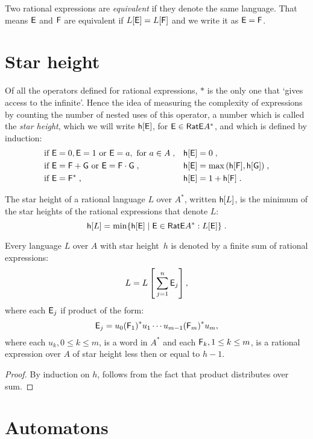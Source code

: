 Two rational expressions are \emph{equivalent} if they denote the same language. That means ${\mathsf{E}}$ and ${\mathsf{F}}$ are equivalent if $L[{\mathsf{E}}] = L[{\mathsf{F}}]$ and we write it as ${\mathsf{E}} = {\mathsf{F}}$.

\section{Star height}

Of all the operators defined for rational expressions, $*$ is the only one that `gives access to the infinite'. Hence the idea of measuring the complexity of expressions by counting the number of nested uses of this operator, a number which is called the \emph{star height}, which we will write ${\mathsf{h}[{\mathsf{E}}]}$, for ${\mathsf{E}} \in {\mathsf{RatE}} A^*$, and which is defined by induction:
\begin{align*}
    &\text{if } {\mathsf{E}} = 0, {\mathsf{E}} = 1 \text{ or } {\mathsf{E}} = a, \text{ for } a \in A \; , & &{\mathsf{h}[{\mathsf{E}}]} = 0 \; , \\
    &\text{if } {\mathsf{E}} = {\mathsf{F}} + {\mathsf{G}} \text{ or } {\mathsf{E}} = {\mathsf{F}} \cdot {\mathsf{G}}\; , & &{\mathsf{h}[{\mathsf{E}}]} = \max{({\mathsf{h}[{\mathsf{F}}]}, {\mathsf{h}[{\mathsf{G}}]})} \; , \\
    &\text{if } {\mathsf{E}} = {\mathsf{F}}^* \; , & &{\mathsf{h}[{\mathsf{E}}]} = 1 + {\mathsf{h}[{\mathsf{F}}]} \; .
\end{align*}

The star height of a rational language $L$ over $A^*$, written ${\mathsf{h}[L]}$, is the minimum of the star heights of the rational expressions that denote $L$:
\[
    {\mathsf{h}[L]} = \min \{ {\mathsf{h}[{\mathsf{E}}]} \mid {\mathsf{E}} \in {\mathsf{RatE}} A^*: L[{\mathsf{E}}] \} \; .
\]

\begin{lemma}\label{lm:star_height_distributivity}
    Every language $L$ over $A$ with star height~$h$ is denoted by a finite sum of rational expressions:
    \[
        L = L \left[ \, \sum_{j=1}^n {\mathsf{E}}_j \right] ,
    \]
    where each ${\mathsf{E}}_j$ if product of the form:
    \[
        {\mathsf{E}}_j = u_0{({\mathsf{F}}_1)}^*u_1 \dotsm u_{m-1}{({\mathsf{F}}_m)}^*u_m,
    \]
    where each $u_k, 0 \leq k \leq m$, is a word in $A^*$ and each ${\mathsf{F}}_k, 1 \leq k \leq m$, is a rational expression over $A$ of star height less then or equal to $h-1$.
\end{lemma}

\begin{proof}
    By induction on $h$, follows from the fact that product distributes over sum. 
\end{proof}

\section{Automatons}

